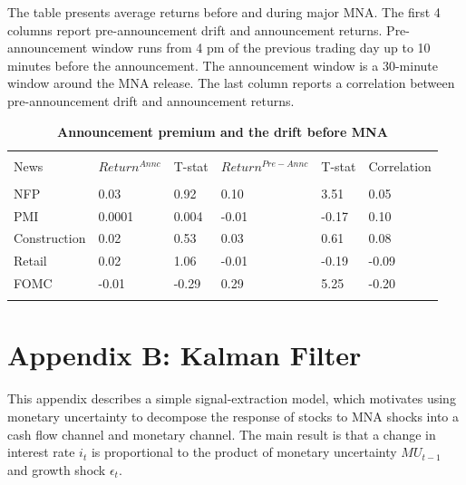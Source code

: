 \documentclass[12pt]{article}
\begin{document}
\begin{table}[!htbp] \centering 
  \caption{\textbf{Announcement premium and the drift before MNA}} 
  \label{}
  \begin{flushleft}
    {\medskip\small
 The table presents average returns before and during major MNA. The first 4 columns report pre-announcement drift and announcement returns. Pre-announcement window runs from 4 pm of the previous trading day up to 10 minutes before the announcement. The announcement window is a 30-minute window around the MNA release. The last column reports a correlation between pre-announcement drift and announcement returns.}
    \medskip
    \end{flushleft}
\begin{tabular}{@{\extracolsep{5pt}} llllll} 
\\[-1.8ex]\hline 
\hline \\[-1.8ex] 
News & $Return^{Annc}$ & T-stat & $Return^{Pre-Annc}$ & T-stat & Correlation \\ 
\hline \\[-1.8ex] 
NFP & 0.03 & 0.92 & 0.10 & 3.51 & 0.05 \\ 
PMI & 0.0001 & 0.004 & -0.01 & -0.17 & 0.10 \\ 
Construction & 0.02 & 0.53 & 0.03 & 0.61 & 0.08 \\ 
Retail & 0.02 & 1.06 & -0.01 & -0.19 & -0.09 \\ 
FOMC & -0.01 & -0.29 & 0.29 & 5.25 & -0.20 \\ 
\hline \\[-1.8ex] 
\end{tabular} 
\end{table} 




\pagebreak
\clearpage



\section{Appendix B: Kalman Filter} \label{sec:Model}
\setcounter{equation}{0}
\renewcommand{\theequation}{B\thechapter.\arabic{equation}}

\paragraph{}
This appendix describes a simple signal-extraction model, which motivates using monetary uncertainty to decompose the response of stocks to MNA shocks into a cash flow channel and monetary channel. The main result is that a change in interest rate $i_t$ is proportional to the product of monetary uncertainty $MU_{t-1}$ and growth shock $\epsilon_t$.
\end{document}

